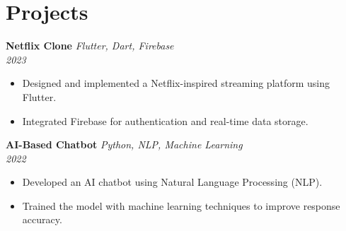 \documentclass[letterpaper,10.5pt]{article}
\begin{document}
\section{Projects}
\textbf{Netflix Clone} \hfill \textit{Flutter, Dart, Firebase} \\
\textit{2023} \\
\begin{itemize}[leftmargin=*]
    \item Designed and implemented a Netflix-inspired streaming platform using Flutter.
    \item Integrated Firebase for authentication and real-time data storage.
\end{itemize}

\textbf{AI-Based Chatbot} \hfill \textit{Python, NLP, Machine Learning} \\
\textit{2022} \\
\begin{itemize}[leftmargin=*]
    \item Developed an AI chatbot using Natural Language Processing (NLP).
    \item Trained the model with machine learning techniques to improve response accuracy.
\end{itemize}
\end{document}
